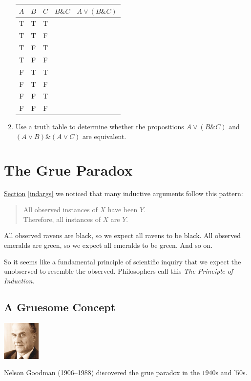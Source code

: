 \documentclass[justified]{tufte-book}
\renewcommand{\wedge}{\mathbin{\&}}
\newenvironment{argument}{\begin{quote}\normalsize}{\end{quote}}
\begin{document}
\begin{enumerate}
  \begin{longtable}[]{@{}ccccc@{}}
  \toprule
  \(A\) & \(B\) & \(C\) & \(B \wedge C\) & \(A \vee (B \wedge C)\)\tabularnewline
  \midrule
  \endhead
  T & T & T & &\tabularnewline
  T & T & F & &\tabularnewline
  T & F & T & &\tabularnewline
  T & F & F & &\tabularnewline
  F & T & T & &\tabularnewline
  F & T & F & &\tabularnewline
  F & F & T & &\tabularnewline
  F & F & F & &\tabularnewline
  \bottomrule
  \end{longtable}
\item
  Use a truth table to determine whether the propositions \(A \vee (B \wedge C)\) and \((A \vee B) \wedge (A \vee C)\) are equivalent.
\end{enumerate}

\hypertarget{grue}{%
\chapter{The Grue Paradox}\label{grue}}

 \protect\hyperlink{indargs}{Section} \ref{indargs} we noticed that many inductive arguments follow this pattern:

\begin{argument}
All observed instances of \(X\) have been \(Y\).\\
Therefore, all instances of \(X\) are \(Y\).
\end{argument}

All observed ravens are black, so we expect all ravens to be black. All observed emeralds are green, so we expect all emeralds to be green. And so on.

So it seems like a fundamental principle of scientific inquiry that we expect the unobserved to resemble the observed. Philosophers call this \emph{The Principle of Induction}.

\hypertarget{a-gruesome-concept}{%
\section*{A Gruesome Concept}\label{a-gruesome-concept}}

\begin{marginfigure}
\includegraphics[width=0.74in]{img/goodman} \caption[Nelson Goodman (1906--1988) discovered the grue paradox in the $1940$s and '$50$s]{Nelson Goodman (1906--1988) discovered the grue paradox in the $1940$s and '$50$s.}\label{fig:unnamed-chunk-48}
\end{marginfigure}
\end{document}
